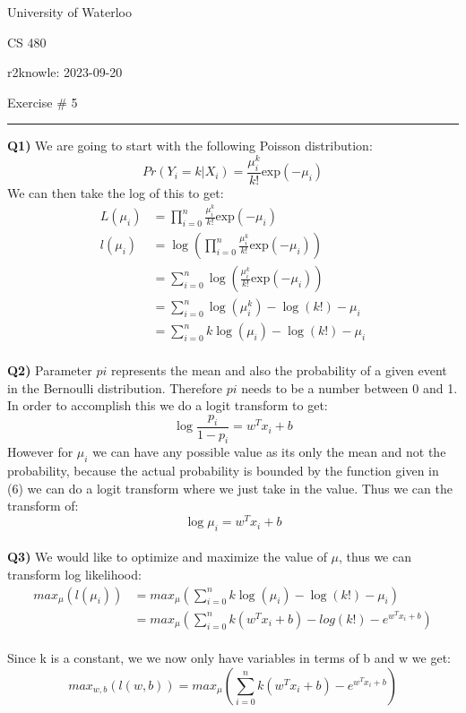 \documentclass{article}
\begin{document}
\begin{titlepage}
	\setlength{\parindent}{0pt}
	\large

\vspace*{-2cm}


University of Waterloo \par
CS 480 \par
\vspace{0.05cm}
r2knowle: 2023-09-20
\vspace{0.2cm}

{\huge Exercise \# 5 \par}
\hrule

\vspace{0.5cm}
\textbf{Q1)} We are going to start with the following Poisson distribution:
\[ Pr(Y_i=k|X_i) = \frac{\mu_i^k}{k!}\text{exp}(-\mu_i) \]
We can then take the log of this to get:
\begin{align*}
L(\mu_i) &= \prod_{i=0}^{n} \frac{\mu_i^k}{k!}\text{exp}(-\mu_i) \\
l(\mu_i) &= \log( \prod_{i=0}^{n} \frac{\mu_i^k}{k!}\text{exp}(-\mu_i)) \\
&= \sum_{i=0}^{n}\log( \frac{\mu_i^k}{k!}\text{exp}(-\mu_i)) \\
&= \sum_{i=0}^{n} \log(\mu_i^k) - \log(k!) -\mu_i \\
&= \sum_{i=0}^{n} k\log(\mu_i) - \log(k!) -\mu_i 
\end{align*}\\
\textbf{Q2)} Parameter $pi$ represents the mean and also the probability of a given event in the Bernoulli distribution. Therefore $pi$ needs to be a number between 0 and 1. In order to accomplish this we do a logit transform to get:
\[ \log \frac{p_i}{1-p_i} = w^Tx_i + b \] 
However for $\mu_i$ we can have any possible value as its only the mean and not the probability, because the actual probability is bounded by the function given in (6) we can do a logit transform where we just take in the value. Thus we can the transform of:
\[ \log \mu_i = w^Tx_i + b \]\\
\textbf{Q3)} We would like to optimize and maximize the value of $\mu$, thus we can transform log likelihood:
\begin{align*}
max_{\mu} \left( l(\mu_i) \right) &= max_{\mu} \left( \sum_{i=0}^{n} k\log(\mu_i) - \log(k!) -\mu_i \right) \\
& = max_{\mu} \left( \sum_{i=0}^{n} k(w^Tx_i+b) - log(k!) - e^{w^Tx_i+b} \right)
\end{align*}\\
Since k is a constant, we we now only have variables in terms of b and w we get:
\[ max_{w,b} \left( l(w,b) \right) = max_{\mu} \left( \sum_{i=0}^{n} k(w^Tx_i+b) - e^{w^Tx_i+b} \right) \]


\end{titlepage}
\end{document}
